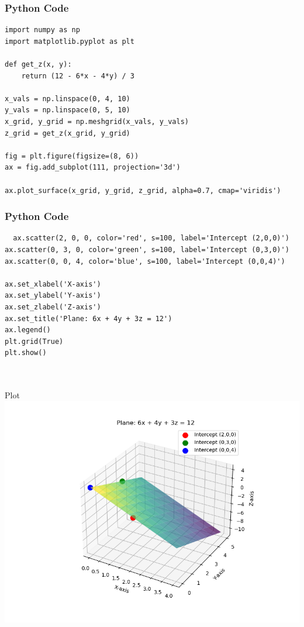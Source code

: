 \documentclass{beamer}
\begin{document}
\begin{frame}[fragile]
    \frametitle{Python Code}
    \begin{lstlisting}
import numpy as np
import matplotlib.pyplot as plt

def get_z(x, y):
    return (12 - 6*x - 4*y) / 3

x_vals = np.linspace(0, 4, 10)
y_vals = np.linspace(0, 5, 10)
x_grid, y_grid = np.meshgrid(x_vals, y_vals)
z_grid = get_z(x_grid, y_grid)

fig = plt.figure(figsize=(8, 6))
ax = fig.add_subplot(111, projection='3d')

ax.plot_surface(x_grid, y_grid, z_grid, alpha=0.7, cmap='viridis')
    \end{lstlisting}
\end{frame}

\begin{frame}[fragile]
    \frametitle{Python Code}
    \begin{lstlisting}
  ax.scatter(2, 0, 0, color='red', s=100, label='Intercept (2,0,0)')
ax.scatter(0, 3, 0, color='green', s=100, label='Intercept (0,3,0)')
ax.scatter(0, 0, 4, color='blue', s=100, label='Intercept (0,0,4)')

ax.set_xlabel('X-axis')
ax.set_ylabel('Y-axis')
ax.set_zlabel('Z-axis')
ax.set_title('Plane: 6x + 4y + 3z = 12')
ax.legend()
plt.grid(True)
plt.show()
  
   
    \end{lstlisting}
\end{frame}


\begin{frame}{Plot}
    \centering
    \includegraphics[width=\columnwidth, height=0.8\textheight, keepaspectratio]{figs/fig2.png}     
\end{frame}
\end{document}
